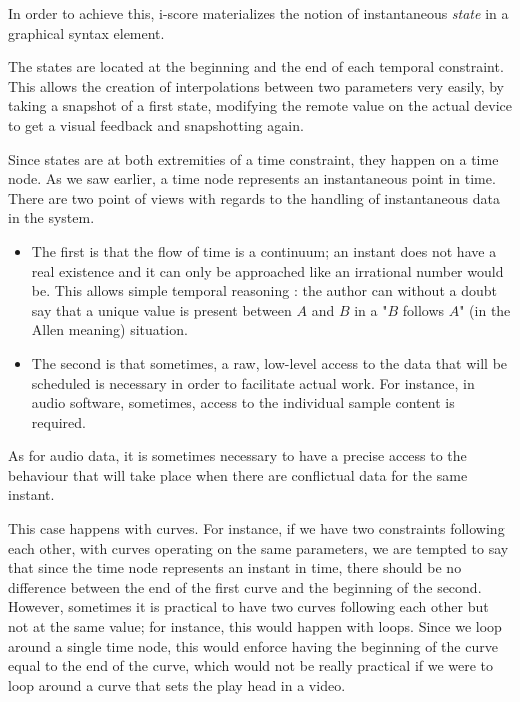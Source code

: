 \documentclass{sigchi}
\begin{document}
In order to achieve this, i-score materializes the notion of instantaneous \textit{state} in a graphical syntax element.

The states are located at the beginning and the end of each temporal constraint. This allows the creation of interpolations between two parameters very easily, by taking a snapshot of a first state, modifying the remote value on the actual device to get a visual feedback and snapshotting again. 

Since states are at both extremities of a time constraint, they happen on a time node. As we saw earlier, a time node represents an instantaneous point in time. 
There are two point of views with regards to the handling of instantaneous data in the system.

\begin{itemize}
	\item The first is that the flow of time is a continuum; an instant does not have a real existence and it can only be approached like an irrational number would be.
	This allows simple temporal reasoning : the author can without a doubt say that a unique value is present between $A$ and $B$ in a "$B$ follows $A$" (in the Allen meaning) situation.
	\item The second is that sometimes, a raw, low-level access to the data that will be scheduled is necessary in order to facilitate actual work. For instance, in audio software, sometimes, access to the individual sample content is required.
\end{itemize}
As for audio data, it is sometimes necessary to have a precise access to the behaviour that will take place when there are conflictual data for the same instant. %

This case happens with curves. For instance, if we have two constraints following each other, with curves operating on the same parameters, we are tempted to say that since the time node represents an instant in time, there should be no difference between the end of the first curve and the beginning of the second. However, sometimes it is practical to have two curves following each other but not at the same value; for instance, this would happen with loops. Since we loop around a single time node, this would enforce having the beginning of the curve equal to the end of the curve, which would not be really practical if we were to loop around a curve that sets the play head in a video.
\end{document}
